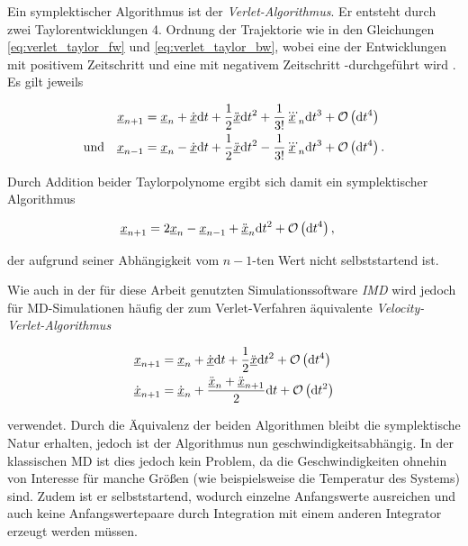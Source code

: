 		Ein symplektischer Algorithmus ist der \emph{Verlet-Algorithmus}. Er entsteht durch zwei
		Taylorentwicklungen 4. Ordnung der Trajektorie wie in den Gleichungen
		\eqref{eq:verlet_taylor_fw} und \eqref{eq:verlet_taylor_bw}, wobei eine der Entwicklungen
		mit positivem Zeitschritt \dt und eine mit negativem Zeitschritt -\dt durchgeführt wird
		\cite{frenkel2001understanding}. Es gilt jeweils

		\begin{align}
			&&\underline{x}_{n+1} &= \underline{x}_n + \dot{\underline{x}}\text{d} t + \frac{1}{2}\ddot{\underline{x}}\text{d} t^2
				+ \frac{1}{3!}\dddot{\underline{x}}_n\text{d} t^3 + \operatorname{\mathcal{O}}\left(\text{d} t^4\right)
				\label{eq:verlet_taylor_fw} \\
			&\text{und}&
			\underline{x}_{n-1} &= \underline{x}_n - \dot{\underline{x}}\text{d} t + \frac{1}{2}\ddot{\underline{x}}\text{d} t^2
				- \frac{1}{3!}\dddot{\underline{x}}_n\text{d} t^3 + \operatorname{\mathcal{O}}\left(\text{d} t^4\right)
				\label{eq:verlet_taylor_bw}
				.
		\end{align}

		Durch Addition beider Taylorpolynome ergibt sich damit ein symplektischer Algorithmus

		\begin{align}
			\underline{x}_{n+1} &= 2 \underline{x}_n - \underline{x}_{n-1} + \ddot{\underline{x}}_n\text{d} t^2
				+ \operatorname{\mathcal{O}}\left(\text{d} t^4\right) \label{eq:verlet},
		\end{align}

		der aufgrund seiner Abhängigkeit vom $n-1$-ten Wert nicht selbststartend ist.

		Wie auch in der für diese Arbeit genutzten Simulationssoftware \emph{IMD}
		\cite{stadler1997imd} wird jedoch für MD-Simulationen häufig der zum Verlet-Verfahren
		äquivalente \emph{Velocity-Verlet-Algorithmus}

		\begin{align}
			\underline{x}_{n+1} &= \underline{x}_n + \dot{\underline{x}}\text{d} t
				+ \frac{1}{2}\ddot{\underline{x}}\text{d} t^2 + \operatorname{\mathcal{O}}\left(\text{d} t^4\right) \nonumber\\
			\dot{\underline{x}}_{n+1} &= \dot{\underline{x}}_n + \frac{\ddot{\underline{x}}_n +
				\ddot{\underline{x}}_{n+1}}{2}\text{d} t + \operatorname{\mathcal{O}}\left(\text{d} t^2\right)
				\label{eq:velocity_verlet}
		\end{align}

		verwendet. Durch die Äquivalenz der beiden Algorithmen bleibt die symplektische Natur
		erhalten, jedoch ist der Algorithmus nun geschwindigkeitsabhängig. In der klassischen MD
		ist dies jedoch kein Problem, da die Geschwindigkeiten ohnehin von Interesse für manche
		Größen (wie beispielsweise die Temperatur des Systems) sind. Zudem ist er selbststartend,
		wodurch einzelne Anfangswerte ausreichen und auch keine Anfangswertepaare durch
		Integration mit einem anderen Integrator erzeugt werden müssen.

